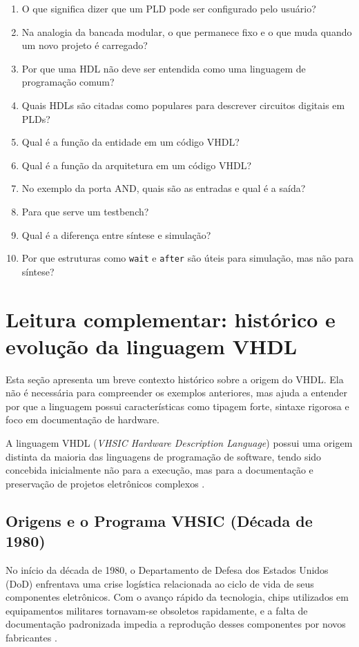 \begin{enumerate}
    \item O que significa dizer que um PLD pode ser configurado pelo usuário?
    \item Na analogia da bancada modular, o que permanece fixo e o que muda quando um novo projeto é carregado?
    \item Por que uma HDL não deve ser entendida como uma linguagem de programação comum?
    \item Quais HDLs são citadas como populares para descrever circuitos digitais em PLDs?
    \item Qual é a função da entidade em um código VHDL?
    \item Qual é a função da arquitetura em um código VHDL?
    \item No exemplo da porta AND, quais são as entradas e qual é a saída?
    \item Para que serve um testbench?
    \item Qual é a diferença entre síntese e simulação?
    \item Por que estruturas como \texttt{wait} e \texttt{after} são úteis para simulação, mas não para síntese?
\end{enumerate}

\section{Leitura complementar: histórico e evolução da linguagem VHDL}

Esta seção apresenta um breve contexto histórico sobre a origem do VHDL. Ela não é necessária para compreender os exemplos anteriores, mas ajuda a entender por que a linguagem possui características como tipagem forte, sintaxe rigorosa e foco em documentação de hardware.

A linguagem VHDL (\textit{VHSIC Hardware Description Language}) possui uma origem distinta da maioria das linguagens de programação de software, tendo sido concebida inicialmente não para a execução, mas para a documentação e preservação de projetos eletrônicos complexos \cite{ashenden2008designer}.

\subsection{Origens e o Programa VHSIC (Década de 1980)}
No início da década de 1980, o Departamento de Defesa dos Estados Unidos (DoD) enfrentava uma crise logística relacionada ao ciclo de vida de seus componentes eletrônicos. Com o avanço rápido da tecnologia, chips utilizados em equipamentos militares tornavam-se obsoletos rapidamente, e a falta de documentação padronizada impedia a reprodução desses componentes por novos fabricantes \cite{dod1981requirements,dewey1983vhdl}.

